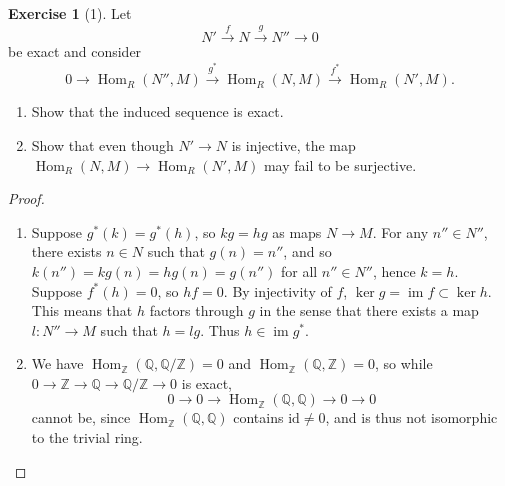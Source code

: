 \documentclass[reqno]{amsart}
\theoremstyle{definition}
\newtheorem{exercise}[theorem]{Exercise}
\theoremstyle{remark}
\DeclareMathOperator{\im}{im}
\DeclareMathOperator{\Hom}{Hom}
\newcommand{\id}{{\mathrm{id}}}
\begin{document}
    \begin{exercise}[1]
        Let
        \[
            N' \stackrel{f}{\to} N \stackrel{g}{\to} N'' \to 0
        \] 
        be exact and consider
        \[
            0 \to \Hom_R \left( N'', M \right) \stackrel{g^{*}}{\to}
            \Hom_R \left( N,M \right) \stackrel{f^{*}}{\to }
        \Hom_R \left( N', M \right) .
        \] 

        \begin{enumerate}
            \item Show that the induced sequence
                is exact.
            \item Show that even though
                $N' \to N$ is injective, the map
                $\Hom_R \left( N,M \right) \to 
                \Hom_R \left( N', M \right) $ may fail to
                be surjective.
        \end{enumerate}
    \end{exercise}

    \begin{proof}
        \begin{enumerate}
            \item Suppose
                $g^{*} \left( k \right) =
                g^{*} (h)$, so
                $kg = hg$ as maps
                $N \to M$. For any $n'' \in N''$, there
                exists $n \in N$ such that $g(n) = n''$, and
                so $k(n'') = kg(n) = hg(n) = g(n'')$ for all
                $n'' \in N''$, hence $k = h$. Suppose
                $f^{*}(h) = 0$, so $hf = 0$. By injectivity of
                $f$,  $\ker g = \im f \subset \ker h$.
                This means that $h$ factors through
                $g$ in the sense that there
                exists a map $l \colon N'' \to M$ such that
                $h = lg$. Thus
                $h \in \im g^{*}$.
            \item We have $\Hom_{\mathbb{Z}}
                \left( \mathbb{Q}, \mathbb{Q} / \mathbb{Z} \right) 
                = 0$ and
                $\Hom_{\mathbb{Z}}\left( \mathbb{Q},
                \mathbb{Z}\right) = 0$, so
                while
                $0 \to \mathbb{Z}\to \mathbb{Q} \to 
                \mathbb{Q} / \mathbb{Z} \to 0$ is exact,
                \[
                0 \to 0 \to \Hom_{\mathbb{Z}}\left( \mathbb{Q},
                \mathbb{Q}\right) \to 
                0 \to 0
                \] 
                cannot be, since
                $\Hom_{\mathbb{Z}}\left( \mathbb{Q},
                \mathbb{Q}\right) $ contains
                $\id \neq 0$, and is thus not isomorphic
                to the trivial ring.
        \end{enumerate}
    \end{proof}






\end{document}
